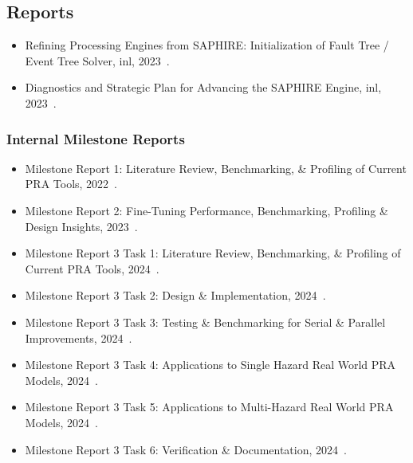 \subsection{Reports}
\begin{itemize}
    \item {Refining Processing Engines from SAPHIRE: Initialization of Fault Tree / Event Tree Solver, \acrshort{inl}, 2023~\cite{aras_refining_2023}.}
    \item {Diagnostics and Strategic Plan for Advancing the SAPHIRE Engine, \acrshort{inl}, 2023~\cite{aras_diagnostics_2023}.}
\end{itemize}
\subsubsection*{Internal Milestone Reports}
\begin{itemize}
    \item {Milestone Report 1: Literature Review, Benchmarking, \& Profiling of Current PRA Tools}, 2022~\cite{aras_milestone_2022}.
    \item {Milestone Report 2: Fine-Tuning Performance, Benchmarking, Profiling \& Design Insights}, 2023~\cite{aras_milestone_2023}.
    \item {Milestone Report 3 Task 1: Literature Review, Benchmarking, \& Profiling of Current PRA Tools}, 2024~\cite{aras_milestone_2024-1}.
    \item {Milestone Report 3 Task 2: Design \& Implementation}, 2024~\cite{aras_milestone_2024-2}.
    \item {Milestone Report 3 Task 3: Testing \& Benchmarking for Serial \& Parallel Improvements}, 2024~\cite{aras_milestone_2024-3}.
    \item {Milestone Report 3 Task 4: Applications to Single Hazard Real World PRA Models}, 2024~\cite{aras_milestone_2024-4}.
    \item {Milestone Report 3 Task 5: Applications to Multi-Hazard Real World PRA Models}, 2024~\cite{aras_milestone_2024-5}.
    \item {Milestone Report 3 Task 6: Verification \& Documentation}, 2024~\cite{rasheeq_milestone_2024-6}.
\end{itemize}